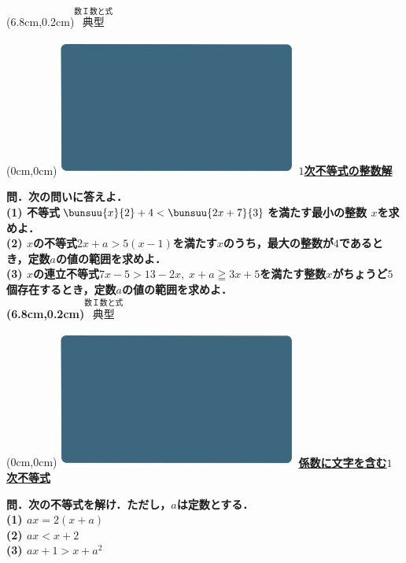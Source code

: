\documentclass[10pt,
fleqn,
dvipdfmx,
uplatex
]{jsarticle}
\begin{document}
\at(6.8cm,0.2cm){\small\color{bradorange}$\overset{\text{数Ｉ数と式}}{\text{典型}}$}


\newpage



\at(0cm,0cm){\includegraphics[width=8cm,bb=0 0 1920 1080]{./youtube/thumbnails/templates/smart_background/数I数と式.jpeg}}
{\color{orange}\bf\boldmath\huge\underline{$1$次不等式の整数解}}\vspace{0.3zw}

\small 
\bf\boldmath 問．次の問いに答えよ．\\
(1)  不等式$\bunsuu{x}{2}+4<\bunsuu{{2x+7}}{3}$を満たす最小の整数
$x$を求めよ．\\
(2)  $x$の不等式$2x+a>5\left(x-1\right)$を満たす$x$のうち，最大の整数が$4$であるとき，定数$a$の値の範囲を求めよ．\\
(3)  $x$の連立不等式$7x-5>{13}-2x,\;x+a\geqq 3x+5$を満たす整数$x$がちょうど$5$個存在するとき，定数$a$の値の範囲を求めよ．\\

\at(6.8cm,0.2cm){\small\color{bradorange}$\overset{\text{数Ｉ数と式}}{\text{典型}}$}


\newpage



\at(0cm,0cm){\includegraphics[width=8cm,bb=0 0 1920 1080]{./youtube/thumbnails/templates/smart_background/数I数と式.jpeg}}
{\color{orange}\bf\boldmath\Large\underline{係数に文字を含む$1$次不等式}}\vspace{0.3zw}

\Large 
\bf\boldmath 問．次の不等式を解け．ただし，$a$は定数とする．\\
(1)  $ax=2\left(x+a\right)$\\
(2)  $ax<x+2$\\
(3)  $ax+1>x+a^2$\\
\end{document}
